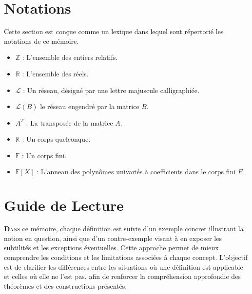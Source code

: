 \documentclass[a4paper,12pt]{report}  %
\theoremstyle{definitionstyle}
\theoremstyle{examplestyle}
\theoremstyle{remarkstyle}
\theoremstyle{propositionstyle}
\theoremstyle{theoremstyle}
\begin{document}
	
	\tableofcontents
	
	\chapter*{Notations}
	
	Cette section est conçue comme un lexique dans lequel sont répertorié les notations de ce mémoire.
	
	\begin{itemize}[label={}]
		\item $\mathbb{Z}$ : L'ensemble des entiers relatifs.
		\item $\mathbb{R}$ : L'ensemble des réels.
		\item $\mathcal{L}$ : Un réseau, désigné par une lettre majuscule calligraphiée.
		\item $\mathcal{L}(B)$ le réseau engendré par la matrice $B$.
		\item $A^T$ : La transposée de la matrice $A$.
		\item $\mathbb{K}$ : Un corps quelconque.
		\item $\mathbb{F}$ : Un corps fini.
		\item $\mathbb{F}[X]$ : L'anneau des polynômes univariés à coefficients dans le corps fini $F$.
	\end{itemize}
	
	
	\chapter*{Guide de Lecture}
	
		\lettrine{\textbf{D}}{ans} ce mémoire, chaque définition est suivie d'un exemple concret illustrant la notion en question, ainsi que d'un contre-exemple visant à en exposer les subtilités et les exceptions éventuelles. Cette approche permet de mieux comprendre les conditions et les limitations associées à chaque concept. L'objectif est de clarifier les différences entre les situations où une définition est applicable et celles où elle ne l'est pas, afin de renforcer la compréhension approfondie des théorèmes et des constructions présentés.
	
\end{document}
